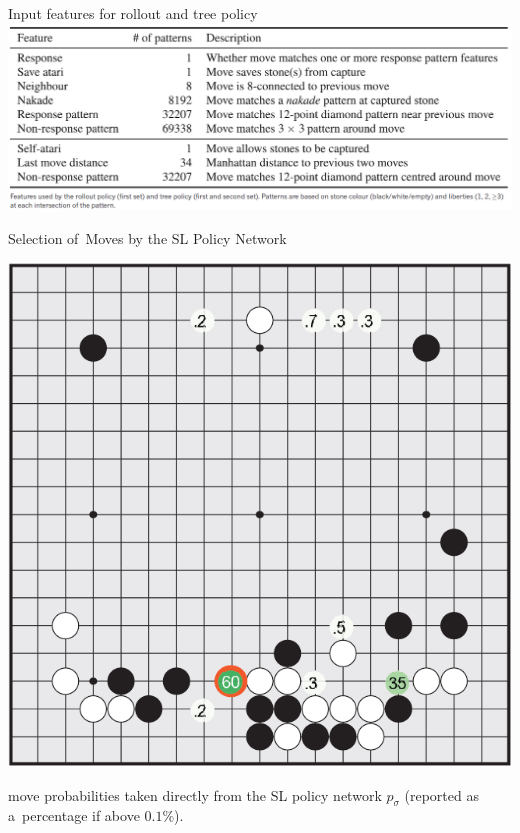 \documentclass{beamer}
\begin{document}
  {

    \begin{frame}{Input features for rollout and tree policy}
      \includegraphics[width=\textwidth]{../img/input_features_for_AlphaGo.png}
    \end{frame}

    \begin{frame}{Selection of~Moves by the SL Policy Network}
      \begin{center}
        \includegraphics[height=.8\textheight]{../img/eval_SL_policy_network.png}

        \tiny
        move probabilities taken directly from the SL policy network $p_\sigma$ (reported as a~percentage if above $0.1\%$).
      \end{center}
    \end{frame}

}
\end{document}
